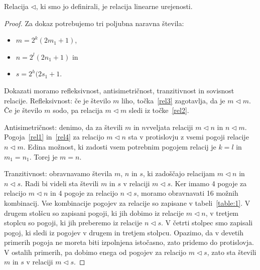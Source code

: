 \documentclass[mat2]{fmfdelo}
\begin{document}
\begin{trditev}
Relacija $\triangleleft$, ki smo jo definirali, je relacija linearne urejenosti.
\end{trditev}
\begin{proof}
Za dokaz potrebujemo tri poljubna naravna števila:
\begin{itemize}
\item $m= 2^k(2m_1 +1)$,
\item $n= 2^l(2n_1 +1)$ in
\item $s=2^h(2s_1+1$.
\end{itemize}
Dokazati moramo refleksivnost, antisimetričnost, tranzitivnost in sovisnost relacije.
Refleksivnost: če je število $m$ liho, točka~\ref{rel3} zagotavlja, da je $m \triangleleft m$. Če je število $m$ sodo, pa relacija $m \triangleleft m$ sledi iz točke~\ref{rel2}.

Antisimetričnost: denimo, da za števili $m$ in $n$vveljata relaciji $m \triangleleft n$ in $n \triangleleft m$. Pogoja~\ref{rel1} in~\ref{rel4} za relacijo $m \triangleleft n$ sta v protislovju z vsemi pogoji relacije $n \triangleleft m$. Edina možnost, ki zadosti vsem potrebnim pogojem relacij je $k=l$ in $m_1 = n_1$. Torej je $m=n$.

Tranzitivnost: obravnavamo števila $m$,  $n$ in $s$, ki zadoščajo relacijam $m \triangleleft n$ in $n \triangleleft s$. Radi bi videli sta števili $m$ in $s$ v relaciji $m \triangleleft s$. Ker imamo 4 pogoje za relacijo $m \triangleleft n$ in 4 pogoje za relacijo $n \triangleleft s$, moramo obravnavati 16 možnih kombinacij. Vse kombinacije pogojev za relacije so zapisane v tabeli~\ref{table:1}. V drugem stolšcu so zapisani pogoji, ki jih dobimo iz relacije $m \triangleleft n$, v tretjem stoplcu so pogoji, ki jih preberemo iz relacije $n \triangleleft s$. V četrti stolpec smo zapisali pogoj, ki sledi iz pogojev v drugem in tretjem stolpcu. Opazimo, da v devetih primerih pogoja ne moreta biti izpolnjena istočasno, zato pridemo do protislovja. V ostalih primerih, pa dobimo enega od pogojev za relacijo $m \triangleleft s$, zato sta števili $m$ in $s$ v relaciji $m \triangleleft s$.


\end{proof}
\end{document}
